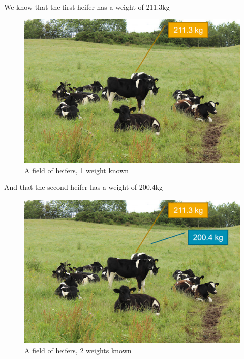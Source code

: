 \documentclass[
]{book}
\begin{document}
We know that the first heifer has a weight of 211.3kg

\begin{figure}

{\centering \includegraphics[width=14.32in]{images/09_statbasic/cows_2} 

}

\caption{A field of heifers, 1 weight known}\label{fig:unnamed-chunk-144}
\end{figure}

And that the second heifer has a weight of 200.4kg

\begin{figure}

{\centering \includegraphics[width=14.32in]{images/09_statbasic/cows_3} 

}

\caption{A field of heifers, 2 weights known}\label{fig:unnamed-chunk-145}
\end{figure}
\end{document}

